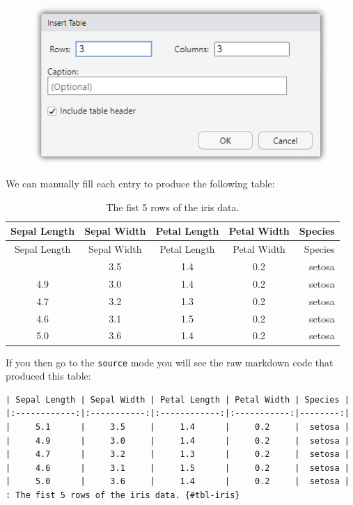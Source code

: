 \documentclass[
  letterpaper,
  DIV=11,
  numbers=noendperiod]{scrartcl}
\begin{document}
\begin{figure}

{\centering \includegraphics[width=4.53125in,height=\textheight]{images/quarto7.png}

}

\end{figure}

We can manually fill each entry to produce the following table:

\begin{longtable}[]{@{}ccccr@{}}
\caption{The fist 5 rows of the iris data.}\tabularnewline
\toprule\noalign{}
Sepal Length & Sepal Width & Petal Length & Petal Width & Species \\
\midrule\noalign{}
\endfirsthead
\toprule\noalign{}
Sepal Length & Sepal Width & Petal Length & Petal Width & Species \\
\midrule\noalign{}
\endhead
\bottomrule\noalign{}
\endlastfoot
5.1 & 3.5 & 1.4 & 0.2 & setosa \\
4.9 & 3.0 & 1.4 & 0.2 & setosa \\
4.7 & 3.2 & 1.3 & 0.2 & setosa \\
4.6 & 3.1 & 1.5 & 0.2 & setosa \\
5.0 & 3.6 & 1.4 & 0.2 & setosa \\
\end{longtable}

If you then go to the \texttt{source} mode you will see the raw markdown
code that produced this table:

\begin{verbatim}
| Sepal Length | Sepal Width | Petal Length | Petal Width | Species |
|:------------:|:-----------:|:------------:|:-----------:|--------:|
|     5.1      |     3.5     |     1.4      |     0.2     |  setosa |
|     4.9      |     3.0     |     1.4      |     0.2     |  setosa |
|     4.7      |     3.2     |     1.3      |     0.2     |  setosa |
|     4.6      |     3.1     |     1.5      |     0.2     |  setosa |
|     5.0      |     3.6     |     1.4      |     0.2     |  setosa |
: The fist 5 rows of the iris data. {#tbl-iris}
\end{verbatim}
\end{document}
